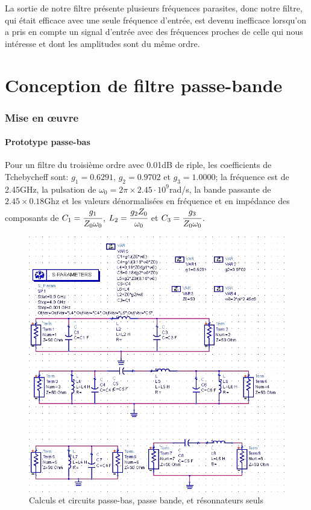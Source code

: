 \documentclass[10pt]{article}
\begin{document}
La sortie de notre filtre présente plusieurs fréquences parasites, donc notre filtre, qui était efficace
avec une seule fréquence d’entrée, est devenu inefficace lorsqu’on a pris en compte un signal d’entrée
avec des fréquences proches de celle qui nous intéresse et dont les amplitudes sont du même ordre.

\part{Conception de filtre passe-bande}
\section{Mise en œuvre}
\subsection{Prototype passe-bas}

Pour un filtre du troisième ordre avec 0.01dB de riple, les coefficients de Tchebycheff sont: 
$g_1=0.6291$, $g_2=0.9702$ et $g_3=1.0000$; la fréquence est de 2.45GHz, la pulsation de 
$\omega_0 = 2\pi\times 2.45\cdot10^9$rad/s, la bande passante de $2.45\times 0.18$Ghz et les valeurs dénormalisées
en fréquence et en impédance des composants de $C_1=\cfrac{g_1}{Z_0\omega_0}$, 
$L_2 = \cfrac{g_2Z_0}{\omega_0}$ et $C_3=\cfrac{g_3}{Z_0\omega_0}$.

\begin{figure}
    \begin{center}
        \includegraphics{p17_circuit}
    \end{center}
    \caption{Calculs et circuits passe-bas, passe bande, et résonnateurs seuls}
\end{figure}
\end{document}
